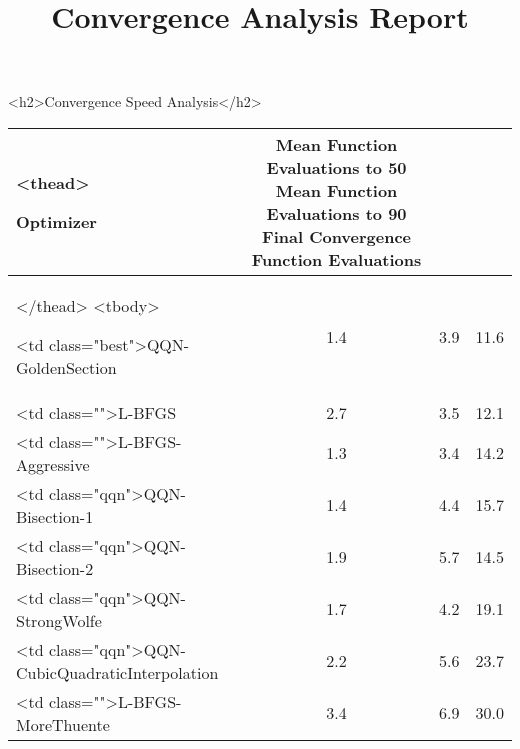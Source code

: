 \documentclass{article}
\begin{document}
\title{Convergence Analysis Report}
\maketitle

    <h2>Convergence Speed Analysis</h2>
    \begin{tabular}{|l|c|c|c|}
\hline
        <thead>
            
                Optimizer & 
                Mean Function Evaluations to 50%
                Mean Function Evaluations to 90%
                Final Convergence Function Evaluations & 
             \\
\hline
        </thead>
        <tbody>
            
                <td class="best">QQN-GoldenSection & 
                1.4 & 
                3.9 & 
                11.6 & 
             \\
\hline
            
                <td class="">L-BFGS & 
                2.7 & 
                3.5 & 
                12.1 & 
             \\
\hline
            
                <td class="">L-BFGS-Aggressive & 
                1.3 & 
                3.4 & 
                14.2 & 
             \\
\hline
            
                <td class="qqn">QQN-Bisection-1 & 
                1.4 & 
                4.4 & 
                15.7 & 
             \\
\hline
            
                <td class="qqn">QQN-Bisection-2 & 
                1.9 & 
                5.7 & 
                14.5 & 
             \\
\hline
            
                <td class="qqn">QQN-StrongWolfe & 
                1.7 & 
                4.2 & 
                19.1 & 
             \\
\hline
            
                <td class="qqn">QQN-CubicQuadraticInterpolation & 
                2.2 & 
                5.6 & 
                23.7 & 
             \\
\hline
            
                <td class="">L-BFGS-MoreThuente & 
                3.4 & 
                6.9 & 
                30.0 & 
             \\
\hline
            

\end{tabular}
\end{document}
